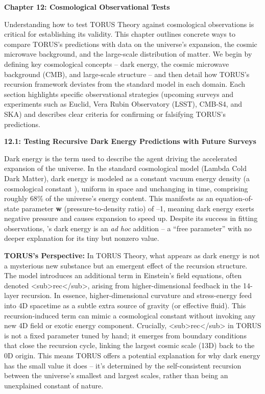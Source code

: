\documentclass[
]{article}
\author{}
\date{}
\begin{document}
\textbf{Chapter 12: Cosmological Observational Tests}

Understanding how to test TORUS Theory against cosmological observations
is critical for establishing its validity. This chapter outlines
concrete ways to compare TORUS's predictions with data on the universe's
expansion, the cosmic microwave background, and the large-scale
distribution of matter. We begin by defining key cosmological concepts
-- dark energy, the cosmic microwave background (CMB), and large-scale
structure -- and then detail how TORUS's recursion framework deviates
from the standard \LambdaCDM model in each domain. Each section highlights
specific observational strategies (upcoming surveys and experiments such
as Euclid, Vera Rubin Observatory (LSST), CMB-S4, and SKA) and describes
clear criteria for confirming or falsifying TORUS's predictions.

\textbf{12.1: Testing Recursive Dark Energy Predictions with Future
Surveys}

Dark energy is the term used to describe the agent driving the
accelerated expansion of the universe. In the standard \LambdaCDM cosmological
model (Lambda Cold Dark Matter), dark energy is modeled as a constant
vacuum energy density (a cosmological constant \Lambda), uniform in space and
unchanging in time, comprising roughly 68\% of the universe's energy
content. This manifests as an equation-of-state parameter \textbf{w}
(pressure-to-density ratio) of --1, meaning dark energy exerts negative
pressure and causes expansion to speed up. Despite its success in
fitting observations, \LambdaCDM's dark energy is an \emph{ad hoc} addition --
a ``free parameter'' with no deeper explanation for its tiny but nonzero
value.

\textbf{TORUS's Perspective:} In TORUS Theory, what appears as dark
energy is not a mysterious new substance but an emergent effect of the
recursion structure. The model introduces an additional term in
Einstein's field equations, often denoted
\Lambda\textless sub\textgreater rec\textless/sub\textgreater, arising from
higher-dimensional feedback in the 14-layer recursion. In essence,
higher-dimensional curvature and stress-energy feed into 4D spacetime as
a subtle extra source of gravity (or effective fluid). This
recursion-induced term can mimic a cosmological constant without
invoking any new 4D field or exotic energy component. Crucially,
\Lambda\textless sub\textgreater rec\textless/sub\textgreater{} in TORUS is
not a fixed parameter tuned by hand; it emerges from boundary conditions
that close the recursion cycle, linking the largest cosmic scale (13D)
back to the 0D origin. This means TORUS offers a potential explanation
for why dark energy has the small value it does -- it's determined by
the self-consistent recursion between the universe's smallest and
largest scales, rather than being an unexplained constant of nature.
\end{document}
